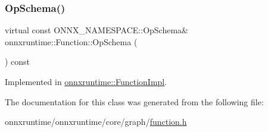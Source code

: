 \mbox{\label{classonnxruntime_1_1Function_aad1b1f67422088275cb4ce6470aa906a}} 
\subsubsection{\texorpdfstring{Op\+Schema()}{OpSchema()}}
{\footnotesize\ttfamily virtual const O\+N\+N\+X\+\_\+\+N\+A\+M\+E\+S\+P\+A\+C\+E\+::\+Op\+Schema\& onnxruntime\+::\+Function\+::\+Op\+Schema (\begin{DoxyParamCaption}{ }\end{DoxyParamCaption}) const\hspace{0.3cm}{\ttfamily [pure virtual]}}



Implemented in \mbox{\hyperlink{classonnxruntime_1_1FunctionImpl_ad003c6cab0d96bd8cd96d2bb5abfce50}{onnxruntime\+::\+Function\+Impl}}.



The documentation for this class was generated from the following file\+:\begin{DoxyCompactItemize}
\item 
onnxruntime/onnxruntime/core/graph/\mbox{\hyperlink{function_8h}{function.\+h}}\end{DoxyCompactItemize}
